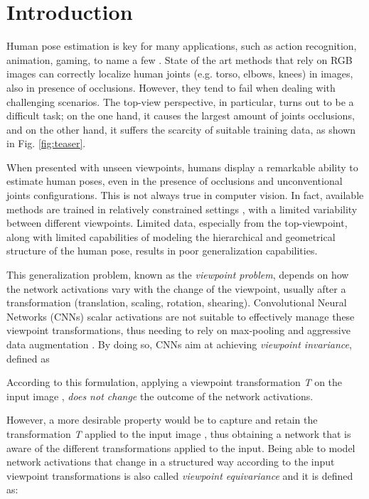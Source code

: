 \documentclass[10pt,twocolumn,letterpaper]{article}
\begin{document}
\section{Introduction}
\label{sec:introduction}

Human pose estimation is key for many applications, such as action recognition, animation, gaming, to name a few \cite{kalfaoglu2020late, starke2019neural, shotton2011real}. 
State of the art methods \cite{cao2017realtime,tome2017lifting} that rely on RGB images can correctly localize human joints (e.g. torso, elbows, knees) in images, also in presence of occlusions. However, they tend to fail when dealing with challenging scenarios. The top-view perspective, in particular, turns out to be a difficult task; on the one hand, it causes the largest amount of joints occlusions, and on the other hand, it suffers the scarcity of suitable training data, as shown in Fig. \ref{fig:teaser}. 

When presented with unseen viewpoints, humans display a remarkable ability to estimate human poses, even in the presence of occlusions and unconventional joints configurations. This is not always true in computer vision. In fact, available methods are trained in relatively constrained settings \cite{Joo_2017_TPAMI}, with a limited variability between different viewpoints. Limited data, especially from the top-viewpoint, along with limited capabilities of modeling the hierarchical and geometrical structure of the human pose, results in poor generalization capabilities.

This generalization problem, known as the \textit{viewpoint problem}, depends on how the network activations vary with the change of the viewpoint, usually after a transformation (translation, scaling, rotation, shearing). Convolutional Neural Networks (CNNs) scalar activations are not suitable to effectively manage these viewpoint transformations, thus needing to rely on max-pooling and aggressive data augmentation \cite{cohen2018spherical, haque2016towards,moon2018v2v,xiong2019a2j}. By doing so, CNNs aim at achieving \textit{viewpoint invariance}, defined as 


According to this formulation, applying a viewpoint transformation \textit{T} on the input image , \textit{does not change} the outcome of the network activations.

However, a more desirable property would be to capture and retain the transformation \textit{T} applied to the input image , thus obtaining a network that is aware of the different transformations applied to the input. Being able to model network activations that change in a structured way according to the input viewpoint transformations is also called \textit{viewpoint equivariance} and it is defined as:
\end{document}
